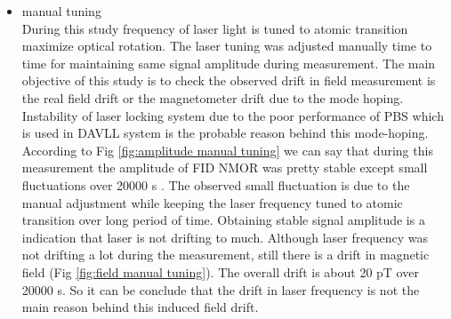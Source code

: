 \begin{itemize}
\item manual tuning\\
   During this study frequency of laser light is tuned to atomic transition maximize optical rotation. The laser tuning was adjusted manually time to time for maintaining same signal amplitude during measurement. The main objective of this study is to check the observed drift in field measurement is the real field drift or the magnetometer drift due to the mode hoping. Instability of laser locking system due to the poor performance of PBS which is used in DAVLL system is the probable reason behind this mode-hoping. According to Fig \ref{fig:amplitude manual tuning} we can say that during this measurement the amplitude of FID NMOR was pretty stable except small fluctuations over 20000 s . The observed small fluctuation is due to the manual adjustment while keeping the laser frequency tuned to atomic transition over long period of time. Obtaining stable signal amplitude is a indication that laser is not drifting to much. Although laser frequency was not drifting a lot during  the measurement, still there is a  drift in magnetic field (Fig \ref{fig:field manual tuning}). The overall drift is about 20 pT over 20000 s. So it can be conclude that the drift in laser frequency is not the main reason behind this induced field drift. 
   
    
   \end{itemize}
